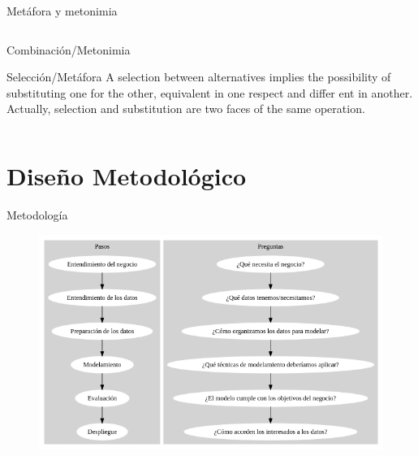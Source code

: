 \documentclass[presentation]{beamer}
\begin{document}
\begin{frame}[label={sec:org4f06d5c}]{Metáfora y metonimia}
\begin{columns}
\begin{column}{0.48\columnwidth}
\begin{block}{Combinación/Metonimia}
   \end{block}

   \begin{block}{Selección/Metáfora}
A selection between alternatives implies the possibility
of substituting one for the other, equivalent in one respect and differ­
ent in another. Actually, selection and substitution are two faces of the
same operation.


   \end{block}

\normal
\end{column}
\end{columns}
\end{frame}
\section{Diseño Metodológico}
\label{sec:orge7f1839}
\begin{frame}[label={sec:org7a72104}]{Metodología}
  \begin{figure}
   \includegraphics[width=\textwidth]{./assets/metodologia.png}

\end{figure}
\end{frame}
\end{document}

